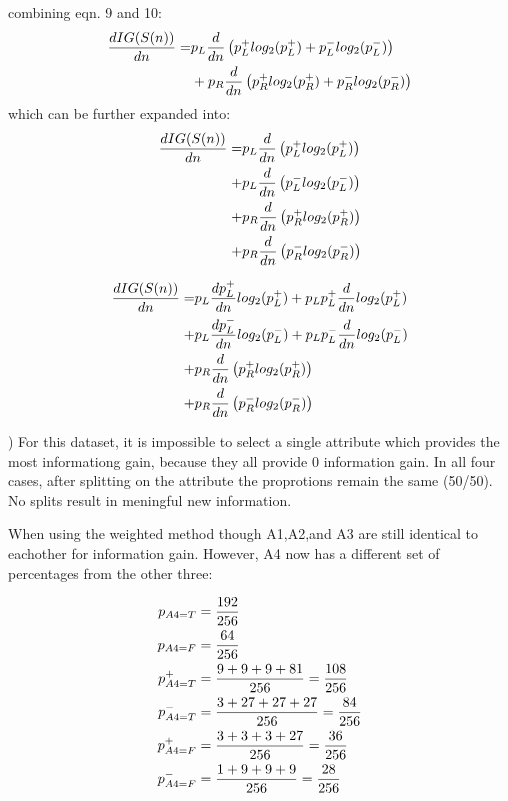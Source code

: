 \documentclass[12pt]{article}
\begin{document}
combining eqn. 9 and 10: 
\begin{align}
    \frac{dIG(S(n))}{dn} =& p_L\frac{d}{dn}\left(p_L^+log_2(p_L^+)+p_L^-log_2(p_L^-)\right) \notag \\
    &+p_R\frac{d}{dn}\left(p_R^+log_2(p_R^+)+p_R^-log_2(p_R^-)\right) \notag \\
\end{align}
which can be further expanded into: 
\begin{align}
    \frac{dIG(S(n))}{dn} =& p_L\frac{d}{dn}\left(p_L^+log_2(p_L^+)\right) \notag \\
    +&p_L\frac{d}{dn}\left(p_L^-log_2(p_L^-)\right) \notag \\
    +&p_R\frac{d}{dn}\left(p_R^+log_2(p_R^+)\right) \notag \\
    +&p_R\frac{d}{dn}\left(p_R^-log_2(p_R^-)\right) \notag \\
\end{align}

\begin{align}
    \frac{dIG(S(n))}{dn} =& p_L\frac{dp_L^+}{dn}log_2(p_L^+) + p_Lp_L^+\frac{d}{dn}log_2(p_L^+)\notag \\
    +&p_L\frac{dp_L^-}{dn}log_2(p_L^-) +p_Lp_L^-\frac{d}{dn}log_2(p_L^-)\notag \\
    +&p_R\frac{d}{dn}\left(p_R^+log_2(p_R^+)\right) \notag \\
    +&p_R\frac{d}{dn}\left(p_R^-log_2(p_R^-)\right) \notag \\
\end{align}

) For this dataset, it is impossible to select a single attribute which provides
the most informationg gain, because they all provide 0 information gain. In all four 
cases, after splitting on the attribute the proprotions remain the same (50/50). No splits 
result in meningful new information. 

When using the weighted method though A1,A2,and A3 are still identical to eachother
for information gain. However, A4 now has a different set of percentages from the other three: 

\begin{align}
    p_{A4=T} &= \frac{192}{256} \notag \\
    p_{A4=F} &= \frac{64}{256} \notag \\
    p_{A4=T}^+ &=\frac{9+9+9+81}{256} = \frac{108}{256} \notag \\
    p_{A4=T}^- &= \frac{3+27+27+27}{256} = \frac{84}{256} \notag \\
    p_{A4=F}^+ &= \frac{3+3+3+27}{256} = \frac{36}{256} \notag \\
    p_{A4=F}^- &= \frac{1+9+9+9}{256} = \frac{28}{256} \notag
 \end{align}
 
\end{document}
